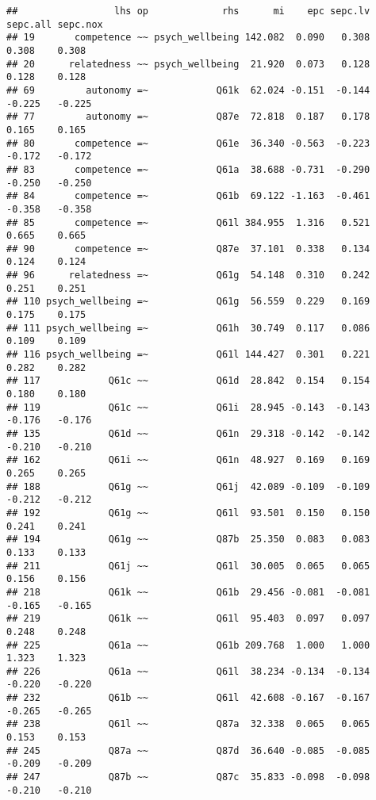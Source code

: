 \documentclass[
]{article}
\begin{document}
\begin{verbatim}
##                 lhs op             rhs      mi    epc sepc.lv sepc.all sepc.nox
## 19       competence ~~ psych_wellbeing 142.082  0.090   0.308    0.308    0.308
## 20      relatedness ~~ psych_wellbeing  21.920  0.073   0.128    0.128    0.128
## 69         autonomy =~            Q61k  62.024 -0.151  -0.144   -0.225   -0.225
## 77         autonomy =~            Q87e  72.818  0.187   0.178    0.165    0.165
## 80       competence =~            Q61e  36.340 -0.563  -0.223   -0.172   -0.172
## 83       competence =~            Q61a  38.688 -0.731  -0.290   -0.250   -0.250
## 84       competence =~            Q61b  69.122 -1.163  -0.461   -0.358   -0.358
## 85       competence =~            Q61l 384.955  1.316   0.521    0.665    0.665
## 90       competence =~            Q87e  37.101  0.338   0.134    0.124    0.124
## 96      relatedness =~            Q61g  54.148  0.310   0.242    0.251    0.251
## 110 psych_wellbeing =~            Q61g  56.559  0.229   0.169    0.175    0.175
## 111 psych_wellbeing =~            Q61h  30.749  0.117   0.086    0.109    0.109
## 116 psych_wellbeing =~            Q61l 144.427  0.301   0.221    0.282    0.282
## 117            Q61c ~~            Q61d  28.842  0.154   0.154    0.180    0.180
## 119            Q61c ~~            Q61i  28.945 -0.143  -0.143   -0.176   -0.176
## 135            Q61d ~~            Q61n  29.318 -0.142  -0.142   -0.210   -0.210
## 162            Q61i ~~            Q61n  48.927  0.169   0.169    0.265    0.265
## 188            Q61g ~~            Q61j  42.089 -0.109  -0.109   -0.212   -0.212
## 192            Q61g ~~            Q61l  93.501  0.150   0.150    0.241    0.241
## 194            Q61g ~~            Q87b  25.350  0.083   0.083    0.133    0.133
## 211            Q61j ~~            Q61l  30.005  0.065   0.065    0.156    0.156
## 218            Q61k ~~            Q61b  29.456 -0.081  -0.081   -0.165   -0.165
## 219            Q61k ~~            Q61l  95.403  0.097   0.097    0.248    0.248
## 225            Q61a ~~            Q61b 209.768  1.000   1.000    1.323    1.323
## 226            Q61a ~~            Q61l  38.234 -0.134  -0.134   -0.220   -0.220
## 232            Q61b ~~            Q61l  42.608 -0.167  -0.167   -0.265   -0.265
## 238            Q61l ~~            Q87a  32.338  0.065   0.065    0.153    0.153
## 245            Q87a ~~            Q87d  36.640 -0.085  -0.085   -0.209   -0.209
## 247            Q87b ~~            Q87c  35.833 -0.098  -0.098   -0.210   -0.210
\end{verbatim}
\end{document}
